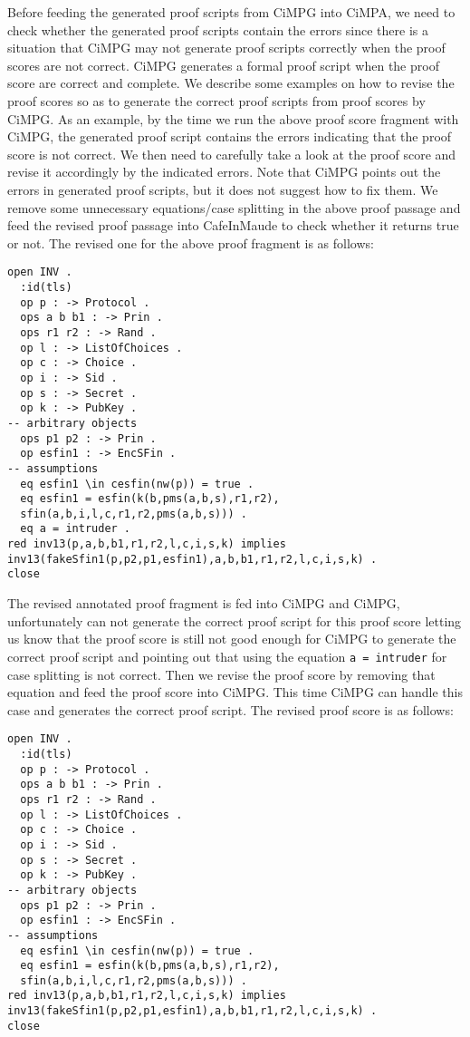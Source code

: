 \documentclass[a4paper,fleqn]{cas-dc}
\begin{document}
Before feeding the generated proof scripts from CiMPG into CiMPA, we need to check whether the generated proof scripts contain the errors since there is a situation that CiMPG may not generate proof scripts correctly when the proof scores are not correct. CiMPG generates a formal proof script when the proof score are correct and complete. We describe some examples on how to revise the proof scores so as to generate the correct proof scripts from proof scores by CiMPG. As an example, by the time we run the above proof score fragment with CiMPG, the generated proof script contains the errors indicating that the proof score is not correct. We then need to carefully take a look at the proof score and revise it accordingly by the indicated errors. Note that CiMPG points out the errors in generated proof scripts, but it does not suggest how to fix them. We remove some unnecessary equations/case splitting in the above proof passage and feed the revised proof passage into CafeInMaude to check whether it returns true or not. The revised one for the above proof fragment is as follows:
\begin{small}
\begin{verbatim}
open INV .
  :id(tls)
  op p : -> Protocol .
  ops a b b1 : -> Prin .
  ops r1 r2 : -> Rand .
  op l : -> ListOfChoices .
  op c : -> Choice .
  op i : -> Sid .
  op s : -> Secret .
  op k : -> PubKey .
-- arbitrary objects
  ops p1 p2 : -> Prin .
  op esfin1 : -> EncSFin .
-- assumptions
  eq esfin1 \in cesfin(nw(p)) = true .
  eq esfin1 = esfin(k(b,pms(a,b,s),r1,r2),
  sfin(a,b,i,l,c,r1,r2,pms(a,b,s))) .
  eq a = intruder .
red inv13(p,a,b,b1,r1,r2,l,c,i,s,k) implies
inv13(fakeSfin1(p,p2,p1,esfin1),a,b,b1,r1,r2,l,c,i,s,k) .
close
\end{verbatim}
\end{small}
The revised annotated proof fragment is fed into CiMPG and CiMPG, unfortunately can not generate the correct proof script for this proof score
letting us know that the proof score is still not good enough for CiMPG to generate the correct proof script and pointing out that using the equation \verb!a = intruder! for case splitting is not correct. Then we revise the proof score by removing that equation and feed the proof score into CiMPG. This time CiMPG can handle this case and generates the correct proof script. The revised proof score is as follows:
\begin{small}
\begin{verbatim}
open INV .
  :id(tls)
  op p : -> Protocol .
  ops a b b1 : -> Prin .
  ops r1 r2 : -> Rand .
  op l : -> ListOfChoices .
  op c : -> Choice .
  op i : -> Sid .
  op s : -> Secret .
  op k : -> PubKey .
-- arbitrary objects
  ops p1 p2 : -> Prin .
  op esfin1 : -> EncSFin .
-- assumptions
  eq esfin1 \in cesfin(nw(p)) = true .
  eq esfin1 = esfin(k(b,pms(a,b,s),r1,r2),
  sfin(a,b,i,l,c,r1,r2,pms(a,b,s))) .
red inv13(p,a,b,b1,r1,r2,l,c,i,s,k) implies
inv13(fakeSfin1(p,p2,p1,esfin1),a,b,b1,r1,r2,l,c,i,s,k) .
close
\end{verbatim}
\end{small}
\end{document}
